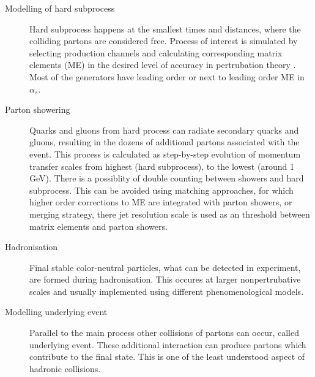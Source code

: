 \begin{description}

\item[Modelling of hard subprocess] Hard subprocess happens at the smallest times and distances, where the colliding partons are considered free. Process of interest is simulated by selecting production channels and calculating corresponding matrix elements (ME) in the desired level of accuracy in pertrubation theory . Most of the generators have leading order or next to leading order ME in $\alpha_s$. 
\item[Parton showering] Quarks and gluons from hard process can radiate secondary quarks and gluons, resulting in the dozens of additional partons associated with the event. This process is calculated as step-by-step evolution of momentum transfer scales from highest (hard subprocess), to the lowest (around 1 GeV). 
There is a possiblity of double counting between showers and hard subprocess. This can be avoided using matching approaches, for which higher order corrections to ME are integrated with parton showers, or merging strategy, there jet resolution scale is used as an threshold between matrix elements and parton showers. 
\item[Hadronisation] Final stable color-neutral particles, what can be detected in experiment, are formed during hadronisation. This occures at larger nonpertrubative scales and  usually implemented using different phenomenological models.
\item[Modelling underlying event] Parallel to the main process other collisions of partons can occur, called underlying event. These additional interaction can produce partons which contribute to the final state. This is one of the least understood aspect of hadronic collisions. 

\end{description}


